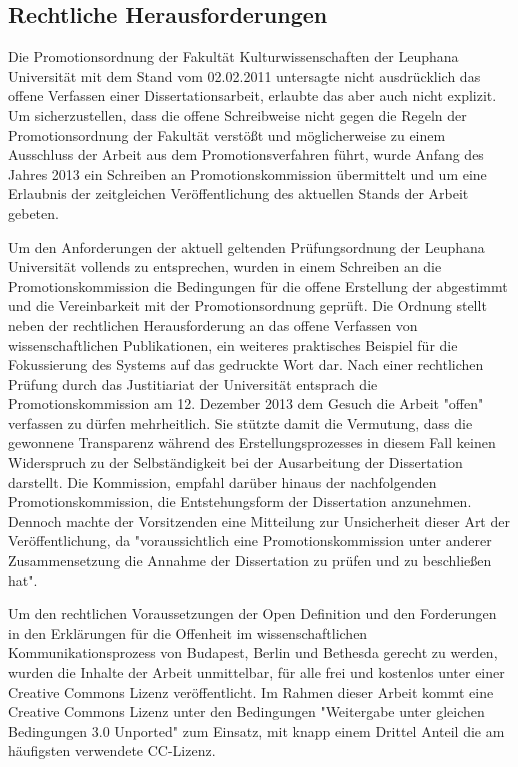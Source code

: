\subsection{Rechtliche Herausforderungen}

Die Promotionsordnung der Fakultät Kulturwissenschaften der Leuphana Universität mit dem Stand vom 02.02.2011 \cite{promotionsordnung_leuphana_kuwi_2011} untersagte nicht ausdrücklich das offene Verfassen einer Dissertationsarbeit, erlaubte das aber auch nicht explizit. Um sicherzustellen, dass die offene Schreibweise nicht gegen die Regeln der Promotionsordnung der Fakultät verstößt und möglicherweise zu einem Ausschluss der Arbeit aus dem Promotionsverfahren führt, wurde Anfang des Jahres 2013 ein Schreiben an Promotionskommission übermittelt und um eine Erlaubnis der zeitgleichen Veröffentlichung des aktuellen Stands der Arbeit gebeten.

Um den Anforderungen der aktuell geltenden Prüfungsordnung der Leuphana Universität vollends zu entsprechen, wurden in einem Schreiben an die Promotionskommission die Bedingungen für die offene Erstellung der abgestimmt und die Vereinbarkeit mit der Promotionsordnung geprüft. Die Ordnung stellt neben der rechtlichen Herausforderung an das offene Verfassen von wissenschaftlichen Publikationen, ein weiteres praktisches Beispiel für die Fokussierung des Systems auf das gedruckte Wort dar. Nach einer rechtlichen Prüfung durch das Justitiariat der Universität entsprach die Promotionskommission am 12. Dezember 2013 dem Gesuch die Arbeit "offen" verfassen zu dürfen mehrheitlich. Sie stützte damit die Vermutung, dass die gewonnene Transparenz während des Erstellungsprozesses in diesem Fall keinen Widerspruch zu der Selbständigkeit bei der Ausarbeitung der Dissertation darstellt. Die Kommission, empfahl darüber hinaus der nachfolgenden Promotionskommission, die Entstehungsform der Dissertation anzunehmen. Dennoch machte der Vorsitzenden eine Mitteilung zur Unsicherheit dieser Art der Veröffentlichung, da "voraussichtlich eine Promotionskommission unter anderer Zusammensetzung die Annahme der Dissertation zu prüfen und zu beschließen hat".

Um den rechtlichen Voraussetzungen der Open Definition und den Forderungen in den Erklärungen für die Offenheit im wissenschaftlichen Kommunikationsprozess von Budapest, Berlin und Bethesda gerecht zu werden, wurden die Inhalte der Arbeit unmittelbar, für alle frei und kostenlos unter einer Creative Commons Lizenz veröffentlicht. Im Rahmen dieser Arbeit kommt eine Creative Commons Lizenz unter den Bedingungen "Weitergabe unter gleichen Bedingungen 3.0 Unported" zum Einsatz, mit knapp einem Drittel Anteil die am häufigsten verwendete CC-Lizenz.

